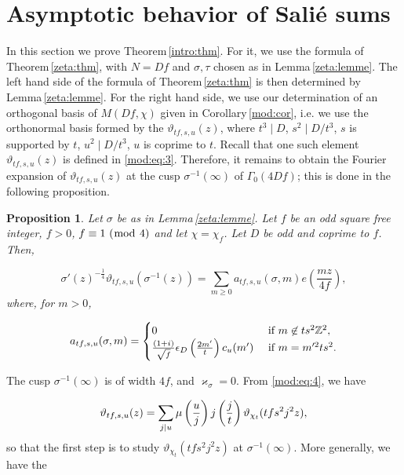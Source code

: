 \documentclass[leqno,10pt]{amsart}
\theoremstyle{plain}
\numberwithin{equation}{section}
\newtheorem{prop}[thm]{Proposition}
\theoremstyle{definition}
\theoremstyle{remark}
\begin{document}
\section{Asymptotic behavior of Sali\'e sums}\label{sec:asymp}

In this section we prove Theorem\,\ref{intro:thm}. For it, we use the formula of Theorem\,\ref{zeta:thm}, with $N=Df$ and $\sigma,\tau$ chosen as in Lemma\,\ref{zeta:lemme}. The left hand side of the formula of Theorem\,\ref{zeta:thm} is then determined by Lemma\,\ref{zeta:lemme}. For the right hand side, we use our determination of an orthogonal basis of $M(Df,\chi)$ given in Corollary\,\ref{mod:cor}, i.e. we use the orthonormal basis formed by the $\vartheta_{tf,s,u}(z)$, where $t^3\mid D$, $s^2\mid D/t^3$, $s$ is supported by $t$, $u^2\mid D/t^3$, $u$ is coprime to $t$.  Recall that one such element $\vartheta_{tf,s,u}(z)$ is defined in \eqref{mod:eq:3}. Therefore, it remains to obtain the Fourier expansion of $\vartheta_{tf,s,u}(z)$ at the cusp $\sigma^{-1}(\infty)$ of $\Gamma_0(4Df)$; this is done in the following proposition. 

\begin{prop}\label{asymp:prop}
Let $\sigma$ be as in Lemma\,\ref{zeta:lemme}. Let $f$ be an odd square free integer, $f>0$,
$f\equiv 1\ (\bmod\  4)$ and let $\chi=\chi_f$. Let $D$ be odd and coprime to $f$. Then, 

\begin{equation*}
\sigma'(z)^{-\frac{1}{4}} \vartheta_{tf,s,u} (\sigma^{-1}(z))= \sum_{m\geqslant 0} a_{tf,s,u}(\sigma,m) e\left(\frac{mz}{4f}\right),
\end{equation*}
where, for $m>0$, 

\begin{equation*}
a_{tf,s,u}(\sigma,m) =\begin{cases}
0 &\textnormal{ if $m \not\in ts^2 \mathbb{Z}^2$},\\
\frac{(1+i)}{\sqrt{f}} \epsilon_D \left(\frac{2m'}{t}\right) 
c_u(m') &\textnormal{ if } m= m'^2 ts^2.
\end{cases}
\end{equation*}
\end{prop}

\proof
The cusp $\sigma^{-1}(\infty)$ is of width $4f$, and $\varkappa_\sigma=0$. From  \eqref{mod:eq:4}, we have 

\begin{equation*}
\vartheta_{tf,s,u} (z) =  \sum_{j \vert u} \mu \left(\frac{u}{j}\right) j \left(\frac{j}{t}\right) \vartheta_{\chi_t} (tf s^2 j^2 z),
\end{equation*}
so that the first step is to study $\vartheta_{\chi_t} (tf s^2 j^2 z)$ at $\sigma^{-1}(\infty)$.
More generally, we have the 
 
\end{document}
